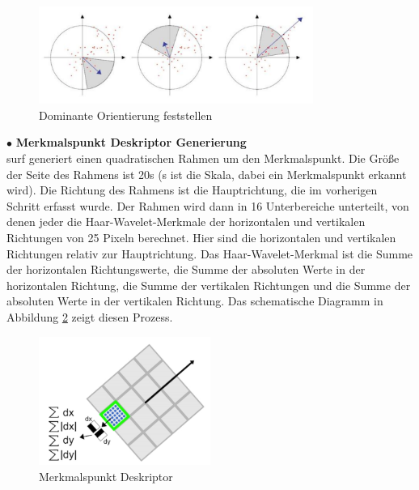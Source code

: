 \begin{figure}[htb]
 \centering 
 \includegraphics[keepaspectratio,width=0.8\textwidth]{images/3_Ersteverfahren/Dominante_Orientierung_Feststellen.pdf}
 \caption{Dominante Orientierung feststellen \cite{Surf}}
 \label{fig:Dominante Orientierung Feststellen}
\end{figure} 


$\bullet$ \textbf{Merkmalspunkt Deskriptor Generierung}\\
\gls{surf} generiert einen quadratischen Rahmen um den Merkmalspunkt. Die Größe der Seite des Rahmens ist 20\si{s} (s ist die Skala, dabei ein Merkmalspunkt erkannt wird). Die Richtung des Rahmens ist die Hauptrichtung, die im vorherigen Schritt erfasst wurde. Der Rahmen wird dann in 16 Unterbereiche unterteilt, von denen jeder die Haar-Wavelet-Merkmale der horizontalen und vertikalen Richtungen von 25 Pixeln berechnet. Hier sind die horizontalen und vertikalen Richtungen relativ zur Hauptrichtung. Das Haar-Wavelet-Merkmal ist die Summe der horizontalen Richtungswerte, die Summe der absoluten Werte in der horizontalen Richtung, die Summe der vertikalen Richtungen und die Summe der absoluten Werte in der vertikalen Richtung. Das schematische Diagramm in Abbildung \ref{fig:Merkmalspunkt Deskriptor} zeigt diesen Prozess.

\begin{figure}[htb]
 \centering 
 \includegraphics[keepaspectratio,width=0.5\textwidth]{images/3_Ersteverfahren/Merkmalspunkt_Deskriptor.pdf}
 \caption{Merkmalspunkt Deskriptor}
 \label{fig:Merkmalspunkt Deskriptor}
\end{figure} 

